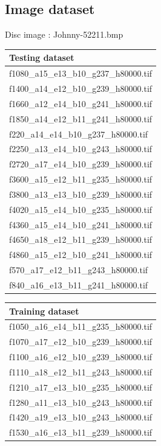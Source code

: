\documentclass[12pt, twoside]{article}
\begin{document}
\begin{appendices}
	\subsection{Image dataset}
	Disc image : Johnny-52211.bmp
	\begin{longtable}{|l|}
		\hline
		Testing dataset \\ \hline 
		f1080\_a15\_e13\_b10\_g237\_h80000.tif \\ \hline 
		f1400\_a14\_e12\_b10\_g239\_h80000.tif \\ \hline 
		f1660\_a12\_e14\_b10\_g241\_h80000.tif \\ \hline 
		f1850\_a14\_e12\_b11\_g241\_h80000.tif \\ \hline 
		f220\_a14\_e14\_b10\_g237\_h80000.tif \\ \hline 
		f2250\_a13\_e14\_b10\_g243\_h80000.tif \\ \hline 
		f2720\_a17\_e14\_b10\_g239\_h80000.tif \\ \hline 
		f3600\_a15\_e12\_b11\_g235\_h80000.tif \\ \hline 
		f3800\_a13\_e13\_b10\_g239\_h80000.tif \\ \hline 
		f4020\_a15\_e14\_b10\_g235\_h80000.tif \\ \hline 
		f4360\_a15\_e14\_b10\_g241\_h80000.tif \\ \hline 
		f4650\_a18\_e12\_b11\_g239\_h80000.tif \\ \hline 
		f4860\_a15\_e12\_b10\_g241\_h80000.tif \\ \hline 
		f570\_a17\_e12\_b11\_g243\_h80000.tif \\ \hline 
		f840\_a16\_e13\_b11\_g241\_h80000.tif \\ \hline 
	\end{longtable}
	\begin{longtable}{|l|}
		\hline
		Training dataset \\ \hline 
		f1050\_a16\_e14\_b11\_g235\_h80000.tif \\ \hline 
		f1070\_a17\_e12\_b10\_g239\_h80000.tif \\ \hline 
		f1100\_a16\_e12\_b10\_g239\_h80000.tif \\ \hline 
		f1110\_a18\_e12\_b11\_g243\_h80000.tif \\ \hline 
		f1210\_a17\_e13\_b10\_g235\_h80000.tif \\ \hline 
		f1280\_a11\_e13\_b10\_g243\_h80000.tif \\ \hline 
		f1420\_a19\_e13\_b10\_g243\_h80000.tif \\ \hline 
		f1530\_a16\_e13\_b11\_g239\_h80000.tif \\ \hline 

\end{longtable}
\end{appendices}
\end{document}
